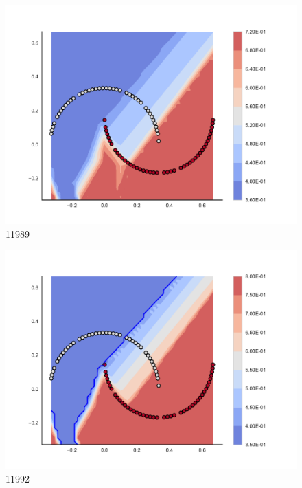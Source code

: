 \begin{subfigure}[b]{0.09\textwidth}
    \includegraphics[clip, trim=2.35cm 1.75cm 4.5cm 0cm,width=\textwidth]{img/convergence/11989.pdf}
    \caption{11989}
    \label{fig:convergence_11989}
\end{subfigure}
%
\begin{subfigure}[b]{0.09\textwidth}
    \includegraphics[clip, trim=2.35cm 1.75cm 4.5cm 0cm,width=\textwidth]{img/convergence/11992.pdf}
    \caption{11992}
    \label{fig:convergence_11992}
\end{subfigure}
%
